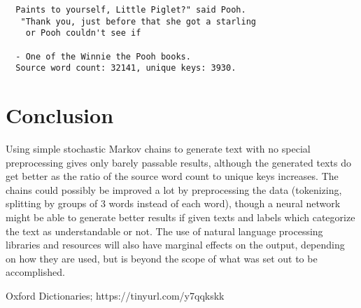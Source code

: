 \documentclass[11pt, a4paper]{article}
\begin{document}
  \begin{lstlisting}
  Paints to yourself, Little Piglet?" said Pooh.
   "Thank you, just before that she got a starling
    or Pooh couldn't see if

  - One of the Winnie the Pooh books.
  Source word count: 32141, unique keys: 3930.
  \end{lstlisting}

  \section{Conclusion}
  Using simple stochastic Markov chains to generate text with no special preprocessing gives only barely passable results, although the generated texts do get better as the ratio of the source word count to unique keys increases. The chains could possibly be improved a lot by preprocessing the data (tokenizing, splitting by groups of 3 words instead of each word), though a neural network might be able to generate better results if given texts and labels which categorize the text as understandable or not. The use of natural language processing libraries and resources will also have marginal effects on the output, depending on how they are used, but is beyond the scope of what was set out to be accomplished.

  \begin{thebibliography}{1}
    Oxford Dictionaries; https://tinyurl.com/y7qqkskk
  \end{thebibliography}
\end{document}
